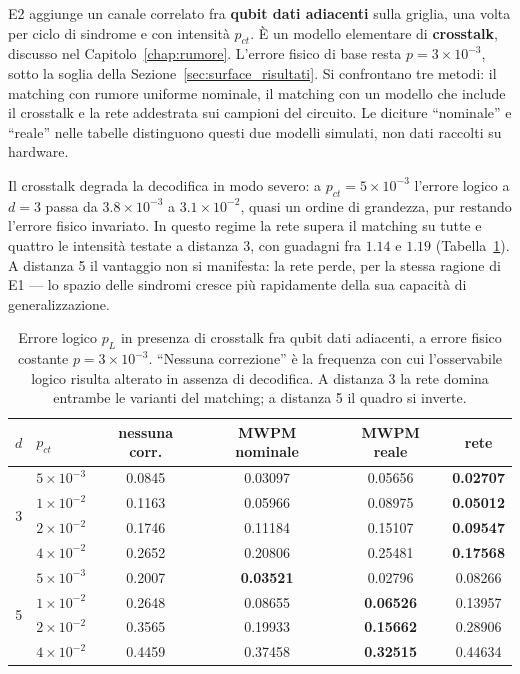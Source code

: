 E2 aggiunge un canale correlato fra \textbf{qubit dati adiacenti} sulla griglia, una volta per ciclo di sindrome e con intensità $p_{ct}$. È un modello elementare di \textbf{crosstalk}, discusso nel Capitolo~\ref{chap:rumore}. L'errore fisico di base resta $p = 3\times10^{-3}$, sotto la soglia della Sezione~\ref{sec:surface_risultati}. Si confrontano tre metodi: il matching con rumore uniforme nominale, il matching con un modello che include il crosstalk e la rete addestrata sui campioni del circuito. Le diciture ``nominale'' e ``reale'' nelle tabelle distinguono questi due modelli simulati, non dati raccolti su hardware.

Il crosstalk degrada la decodifica in modo severo: a $p_{ct} = 5\times10^{-3}$ l'errore logico a $d=3$ passa da $3.8\times10^{-3}$ a $3.1\times10^{-2}$, quasi un ordine di grandezza, pur restando l'errore fisico invariato. In questo regime la rete supera il matching su tutte e quattro le intensità testate a distanza 3, con guadagni fra $1.14$ e $1.19$ (Tabella~\ref{tab:neural_crosstalk}). A distanza 5 il vantaggio non si manifesta: la rete perde, per la stessa ragione di E1 --- lo spazio delle sindromi cresce più rapidamente della sua capacità di generalizzazione.

\begin{table}[H]
\centering
\small
\begin{tabular}{clcccc}
\toprule
$d$ & $p_{ct}$ & \textbf{nessuna corr.} & \textbf{MWPM nominale} & \textbf{MWPM reale} & \textbf{rete} \\
\midrule
\multirow{4}{*}{3} & $5\times10^{-3}$ & 0.0845 & 0.03097 & 0.05656 & \textbf{0.02707} \\
                   & $1\times10^{-2}$ & 0.1163 & 0.05966 & 0.08975 & \textbf{0.05012} \\
                   & $2\times10^{-2}$ & 0.1746 & 0.11184 & 0.15107 & \textbf{0.09547} \\
                   & $4\times10^{-2}$ & 0.2652 & 0.20806 & 0.25481 & \textbf{0.17568} \\
\midrule
\multirow{4}{*}{5} & $5\times10^{-3}$ & 0.2007 & \textbf{0.03521} & 0.02796 & 0.08266 \\
                   & $1\times10^{-2}$ & 0.2648 & 0.08655 & \textbf{0.06526} & 0.13957 \\
                   & $2\times10^{-2}$ & 0.3565 & 0.19933 & \textbf{0.15662} & 0.28906 \\
                   & $4\times10^{-2}$ & 0.4459 & 0.37458 & \textbf{0.32515} & 0.44634 \\
\bottomrule
\end{tabular}
\caption[Decodifica in presenza di rumore correlato]{Errore logico $p_L$ in presenza di crosstalk fra qubit dati adiacenti, a errore fisico costante $p = 3\times10^{-3}$. ``Nessuna correzione'' è la frequenza con cui l'osservabile logico risulta alterato in assenza di decodifica. A distanza 3 la rete domina entrambe le varianti del matching; a distanza 5 il quadro si inverte.}
\label{tab:neural_crosstalk}
\end{table}

